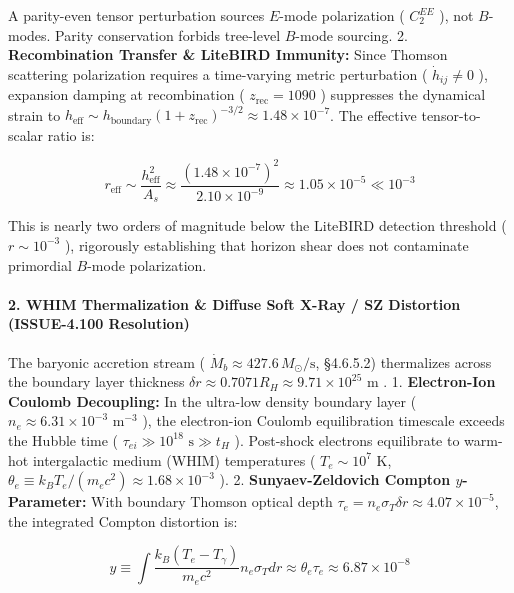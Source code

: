 \documentclass[11pt,a4paper]{article}
\theoremstyle{definition}\newtheorem{definition}{Definition}
\theoremstyle{remark}\newtheorem{remark}{Remark}
\begin{document}
A parity-even tensor perturbation sources $E$-mode polarization ( $C_2^{EE}$ ), not $B$-modes. Parity conservation forbids tree-level $B$-mode sourcing.
2. \textbf{Recombination Transfer \& LiteBIRD Immunity:} Since Thomson scattering polarization requires a time-varying metric perturbation ( $\dot{h}_{ij} \neq 0$ ), expansion damping at recombination ( $z_{\text{rec}} = 1090$ ) suppresses the dynamical strain to $h_{\text{eff}} \sim h_{\text{boundary}} (1 + z_{\text{rec}})^{-3/2} \approx 1.48 \times 10^{-7}$. The effective tensor-to-scalar ratio is:


\begin{equation}
r_{\text{eff}} \sim \frac{h_{\text{eff}}^2}{A_s} \approx \frac{(1.48 \times 10^{-7})^2}{2.10 \times 10^{-9}} \approx 1.05 \times 10^{-5} \ll 10^{-3}
\end{equation}


This is nearly two orders of magnitude below the LiteBIRD detection threshold ( $r \sim 10^{-3}$ ), rigorously establishing that horizon shear does not contaminate primordial $B$-mode polarization.
\paragraph{2. WHIM Thermalization \& Diffuse Soft X-Ray / SZ Distortion (ISSUE-4.100 Resolution)}

The baryonic accretion stream ( $\dot{M}_b \approx 427.6 \, M_\odot/\text{s}$, §4.6.5.2) thermalizes across the boundary layer thickness $\delta r \approx 0.7071 R_H \approx 9.71 \times 10^{25}\text{ m}$ .
1. \textbf{Electron-Ion Coulomb Decoupling:} In the ultra-low density boundary layer ( $n_e \approx 6.31 \times 10^{-3}\text{ m}^{-3}$ ), the electron-ion Coulomb equilibration timescale exceeds the Hubble time ( $\tau_{ei} \gg 10^{18}\text{ s} \gg t_H$ ). Post-shock electrons equilibrate to warm-hot intergalactic medium (WHIM) temperatures ( $T_e \sim 10^7\text{ K}$, $\theta_e \equiv k_B T_e / (m_e c^2) \approx 1.68 \times 10^{-3}$ ).
2. \textbf{Sunyaev-Zeldovich Compton $y$-Parameter:} With boundary Thomson optical depth $\tau_e = n_e \sigma_T \delta r \approx 4.07 \times 10^{-5}$, the integrated Compton distortion is:


\begin{equation}
y \equiv \int \frac{k_B (T_e - T_\gamma)}{m_e c^2} n_e \sigma_T dr \approx \theta_e \tau_e \approx 6.87 \times 10^{-8}
\end{equation}
\end{document}
